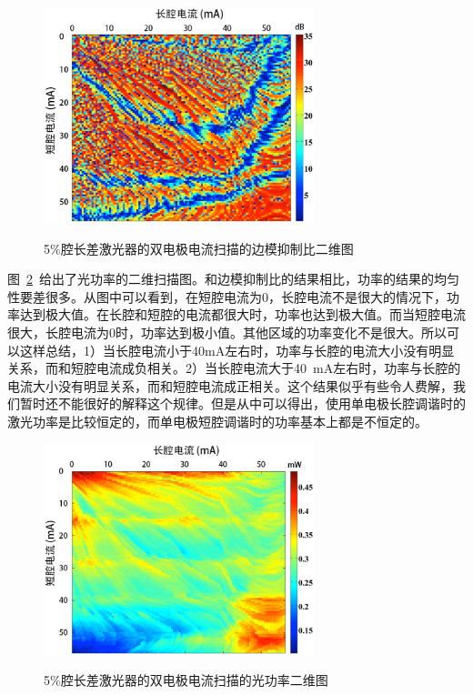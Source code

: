 \documentclass{ZJUthesis}
\begin{document}
\begin{figure}[htbp]
  \centering
  \includegraphics[width=0.7\textwidth]{./Pictures/2d2.eps}\\
  \caption{5\%腔长差激光器的双电极电流扫描的边模抑制比二维图}
  \label{fig_2d2}
\end{figure}

图~\ref{fig_2d3}~给出了光功率的二维扫描图。和边模抑制比的结果相比，功率的结果的均匀性要差很多。从图中可以看到，在短腔电流为0，长腔电流不是很大的情况下，功率达到极大值。在长腔和短腔的电流都很大时，功率也达到极大值。而当短腔电流很大，长腔电流为0时，功率达到极小值。其他区域的功率变化不是很大。所以可以这样总结，1）当长腔电流小于40mA左右时，功率与长腔的电流大小没有明显关系，而和短腔电流成负相关。2）当长腔电流大于40~mA左右时，功率与长腔的电流大小没有明显关系，而和短腔电流成正相关。这个结果似乎有些令人费解，我们暂时还不能很好的解释这个规律。但是从中可以得出，使用单电极长腔调谐时的激光功率是比较恒定的，而单电极短腔调谐时的功率基本上都是不恒定的。

\begin{figure}[htbp]
  \centering
  \includegraphics[width=0.7\textwidth]{./Pictures/2d3.eps}\\
  \caption{5\%腔长差激光器的双电极电流扫描的光功率二维图}
  \label{fig_2d3}
\end{figure}
\end{document}
